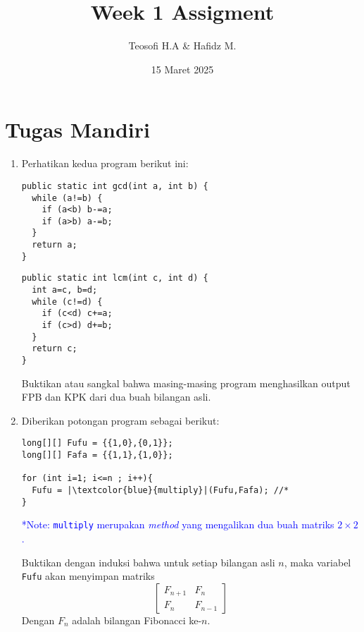 \documentclass[10pt,openany,a4paper]{article}
\title{\textbf{Week 1 Assigment}}
\date{15 Maret 2025}
\author{Teosofi H.A \& Hafidz M.}
\begin{document}
  \maketitle
  \section*{Tugas Mandiri}
  \begin{enumerate}
    \item Perhatikan kedua program berikut ini:
    \begin{multicols}{2}
      \begin{verbatim}
public static int gcd(int a, int b) {
  while (a!=b) {
    if (a<b) b-=a;
    if (a>b) a-=b;
  }
  return a;
}
      \end{verbatim}
      \columnbreak
      \begin{verbatim}
public static int lcm(int c, int d) {
  int a=c, b=d;
  while (c!=d) {
    if (c<d) c+=a;
    if (c>d) d+=b;
  }
  return c;
}
      \end{verbatim}
    \end{multicols}
    Buktikan atau sangkal bahwa masing-masing program menghasilkan output FPB dan KPK dari dua buah bilangan asli.

    \item Diberikan potongan program sebagai berikut:
    \begin{verbatim}
long[][] Fufu = {{1,0},{0,1}};
long[][] Fafa = {{1,1},{1,0}};

for (int i=1; i<=n ; i++){
  Fufu = |\textcolor{blue}{multiply}|(Fufu,Fafa); //*
}
    \end{verbatim}
    \textcolor{blue}{*Note: \texttt{multiply} merupakan \textit{method} yang mengalikan dua buah matriks $2\times 2$.}

    Buktikan dengan induksi bahwa untuk setiap bilangan asli $n$, maka variabel \texttt{Fufu} akan menyimpan matriks
    \[\begin{bmatrix}
      F_{n+1} & F_n\\
      F_n & F_{n-1}
    \end{bmatrix}\]
    Dengan $F_n$ adalah bilangan Fibonacci ke-$n$.
  \end{enumerate}
\end{document}
